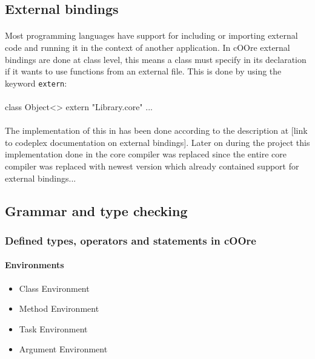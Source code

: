 \documentclass[paper=a4, fontsize=11pt]{article}
\numberwithin{equation}{section}	%
\numberwithin{figure}{section}		%
\numberwithin{table}{section}		%
\begin{document}
	
	\subsection {External bindings}
	    \paragraph {}
	        Most programming languages have support for including or importing external code and running it in the context of another application. In cOOre external bindings are done at class level, this means a class must specify in its declaration if it wants to use functions from an external file. This is done by using the keyword \texttt{extern}:
	    
	    \paragraph {}
    	    class Object<> extern "Library.core" {
	            ...
	        }
	    
	    \paragraph{}
	        The implementation of this in has been done according to the description at [link to codeplex documentation on external bindings]. Later on during the project this implementation done in the core compiler was replaced since the entire core compiler was replaced with newest version which already contained support for external bindings...
	    
	\subsection {Grammar and type checking}
	    
	    \subsubsection{Defined types, operators and statements in cOOre}

            \paragraph*{Environments}
                \begin{itemize}
            	\item Class Environment
            	\item Method Environment
            	\item Task Environment
            	\item Argument Environment
            \end{itemize}
\end{document}

